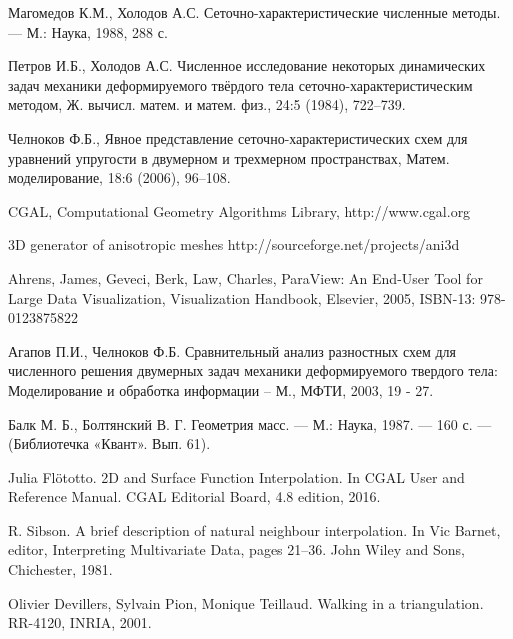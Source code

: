 \begin{thebibliography}{99}

 Магомедов К.М., Холодов А.С. 
Сеточно-характеристические численные методы. — М.: Наука, 1988, 288 с.

 Петров И.Б., Холодов А.С. 
Численное исследование некоторых динамических задач механики деформируемого 
твёрдого тела сеточно-характеристическим методом, 
Ж. вычисл. матем. и матем. физ., 24:5 (1984), 722–739.

 Челноков Ф.Б., Явное представление 
сеточно-характеристических схем для уравнений упругости в двумерном и
 трехмерном пространствах, Матем. моделирование, 18:6 (2006), 96–108.

 CGAL, Computational Geometry Algorithms Library, http://www.cgal.org

 3D generator of anisotropic meshes http://sourceforge.net/projects/ani3d

 Ahrens, James, Geveci, Berk, Law, Charles, 
ParaView: An End-User Tool for Large Data Visualization, Visualization Handbook, Elsevier, 2005, ISBN-13: 978-0123875822

 Агапов П.И., Челноков Ф.Б. 
Сравнительный анализ разностных схем для численного решения двумерных задач 
механики деформируемого твердого тела: Моделирование и обработка информации -- М., МФТИ, 2003, 19 - 27.

 Балк М. Б., Болтянский В. Г. Геометрия масс. — М.: 
Наука, 1987. — 160 с. — (Библиотечка «Квант». Вып. 61).

 Julia Flötotto. 2D and Surface Function Interpolation. 
In CGAL User and Reference Manual. CGAL Editorial Board, 4.8 edition, 2016.

 R. Sibson. A brief description of natural neighbour interpolation. 
In Vic Barnet, editor, Interpreting Multivariate Data, pages 21–36. John Wiley and Sons, Chichester, 1981.

 Olivier Devillers, Sylvain Pion, Monique Teillaud. 
Walking in a triangulation. RR-4120, INRIA, 2001.

\end{thebibliography}














